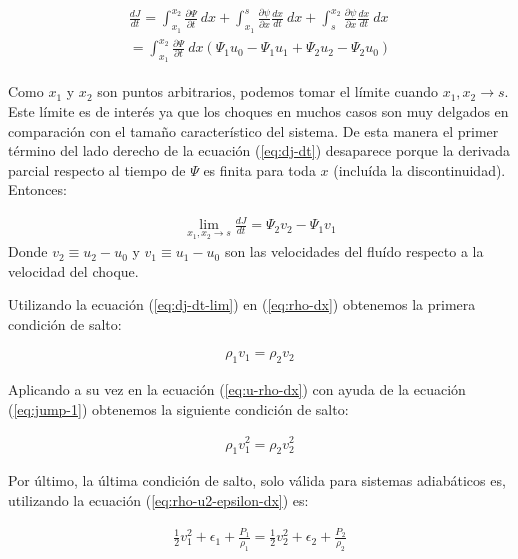 \begin{align}
  \begin{split}
    \frac{dJ}{dt} = \int^{x_2}_{x_1} \frac{\partial\Psi}{\partial t}~dx + \int^{s}_{x_1}\frac{\partial\psi}{\partial x}\frac{dx}{dt}~dx +  \int^{x_2}_{s}\frac{\partial\psi}{\partial x}\frac{dx}{dt}~dx \\= \int^{x_2}_{x_1}\frac{\partial\Psi}{\partial t}~dx\left(\Psi_1u_0-\Psi_1u_1+\Psi_2u_2-\Psi_2u_0\right) \label{eq:dj-dt}
    \end{split}
\end{align}

Como $x_1$ y $x_2$ son puntos arbitrarios, podemos tomar el límite cuando $x_1, x_2 \to s$. Este límite es de interés ya que los choques en muchos casos son muy delgados en comparación con el tamaño característico del sistema. De esta manera el primer término del lado derecho de la ecuación (\ref{eq:dj-dt}) desaparece porque la derivada parcial respecto al tiempo de $\Psi$ es finita para toda $x$ (incluída la discontinuidad). Entonces:

\begin{align}
  \lim_{x_1, x_2 \to s}\frac{dJ}{dt} = \Psi_2v_2 - \Psi_1v_1 \label{eq:dj-dt-lim}
\end{align}
Donde $v_2\equiv u_2 - u_0$ y $v_1 \equiv u_1-u_0$ son las velocidades del fluído respecto a la velocidad del choque.

Utilizando la ecuación (\ref{eq:dj-dt-lim}) en (\ref{eq:rho-dx}) obtenemos la primera condición de salto:

\begin{align}
  \rho_1v_1 = \rho_2v_2 \label{eq:jump-1}
\end{align}

Aplicando a su vez en la ecuación (\ref{eq:u-rho-dx}) con ayuda de la ecuación (\ref{eq:jump-1}) obtenemos la siguiente condición de salto:

\begin{align}
  \rho_1v^2_1 = \rho_2v^2_2 \label{eq:jump-2}
\end{align}

Por último, la última condición de salto, solo válida para sistemas adiabáticos es, utilizando la ecuación (\ref{eq:rho-u2-epsilon-dx}) es:

\begin{align}
  \frac{1}{2}v^2_1 + \epsilon_1 + \frac{P_1}{\rho_1} = \frac{1}{2}v^2_2 + \epsilon_2 + \frac{P_2}{\rho_2} \label{eq:jump-3}
\end{align}

